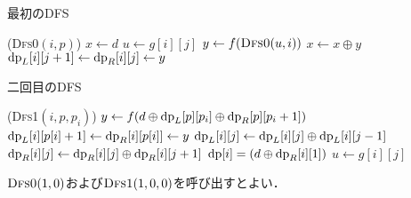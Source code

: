 \documentclass{jsarticle}
\newcommand{\DP}{\ensuremath\mathrm{dp}}
\begin{document}
\newpage
\begin{alg}
  \caption{最初のDFS}
  \Function(\textsc{Dfs0}{$(i, p)$})
  {
    {$x \gets d$}
    {
      {$u \gets g[i][j]$}\;
      {$y \gets f(\text{\textsc{Dfs0}}(u, i))$}\;
      {$x \gets x \oplus y$}\;
      {$\DP_L[i][j+1] \gets \DP_R[i][j] \gets y$}\;
    }
    \;
  }
\end{alg}

\begin{alg}
  \caption{二回目のDFS}
  \Function(\textsc{Dfs1}{$(i, p, p_i)$})
  {
    {
      {$y \gets f(d \oplus \DP_L[p][p_i] \oplus \DP_R[p][p_i+1])$}\;
      {$\DP_L[i][p[i]+1] \gets \DP_R[i][p[i]] \gets y$}\;
    }
    {
      {$\DP_L[i][j] \gets \DP_L[i][j] \oplus \DP_L[i][j-1]$}\;
    }
    {
      {$\DP_R[i][j] \gets \DP_R[i][j] \oplus \DP_R[i][j+1]$}\;
    }
    {$\DP[i] = (d \oplus \DP_R[i][1])$}\;
    {
      {$u \gets g[i][j]$}\;
    }
  }
\end{alg}

$\text{\textsc{Dfs0}}(1, 0)$および$\text{\textsc{Dfs1}}(1, 0, 0)$を呼び出すとよい．
\end{document}
